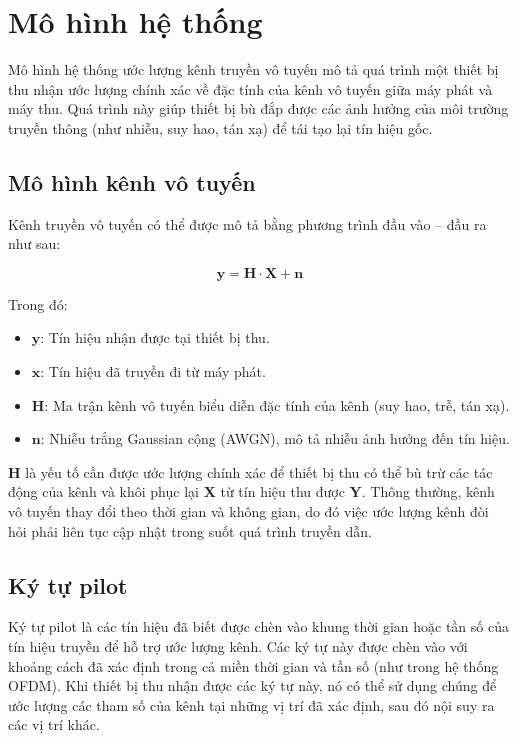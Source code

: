 \section{Mô hình hệ thống}

Mô hình hệ thống ước lượng kênh truyền vô tuyến mô tả quá trình một thiết bị thu nhận ước lượng chính xác về đặc tính của kênh vô tuyến giữa máy phát và máy thu. Quá trình này giúp thiết bị bù đắp được các ảnh hưởng của môi trường truyền thông (như nhiễu, suy hao, tán xạ) để tái tạo lại tín hiệu gốc. 

\subsection{Mô hình kênh vô tuyến}

Kênh truyền vô tuyến có thể được mô tả bằng phương trình đầu vào – đầu ra như sau:

\begin{equation}
    \bm{y} = \bm{H} \cdot \bm{X} + \bm{n}
\end{equation}

Trong đó:
\begin{itemize}
    \item $\bm{y}$: Tín hiệu nhận được tại thiết bị thu.
    \item $\bm{x}$: Tín hiệu đã truyền đi từ máy phát.
    \item $\bm{H}$: Ma trận kênh vô tuyến biểu diễn đặc tính của kênh (suy hao, trễ, tán xạ).
    \item $\bm{n}$: Nhiễu trắng Gaussian cộng (AWGN), mô tả nhiễu ảnh hưởng đến tín hiệu.
\end{itemize}

$\bm{H}$ là yếu tố cần được ước lượng chính xác để thiết bị thu có thể bù trừ các tác động của kênh 
và khôi phục lại $\bm{X}$ từ tín hiệu thu được $\bm{Y}$. 
Thông thường, kênh vô tuyến thay đổi theo thời gian và không gian, 
do đó việc ước lượng kênh đòi hỏi phải liên tục cập nhật trong suốt quá trình truyền dẫn.

\subsection{Ký tự pilot}

Ký tự pilot là các tín hiệu đã biết được chèn vào khung thời gian hoặc tần số của tín hiệu truyền để hỗ trợ ước lượng kênh. 
Các ký tự này được chèn vào với khoảng cách đã xác định trong cả miền thời gian và tần số (như trong hệ thống OFDM). 
Khi thiết bị thu nhận được các ký tự này, nó có thể sử dụng chúng để ước lượng các tham số của kênh tại những vị trí đã xác định, sau đó nội suy ra các vị trí khác.

